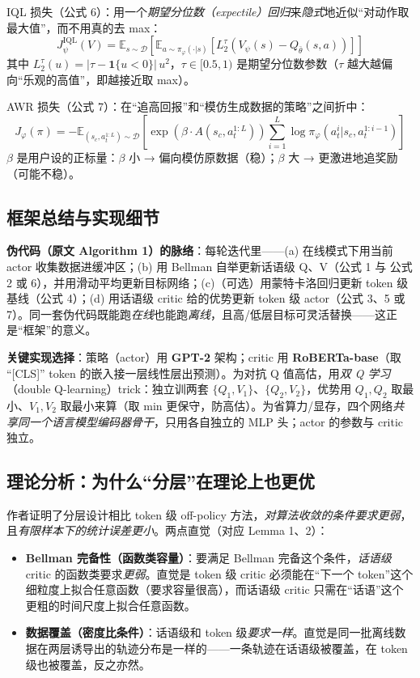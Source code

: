 \documentclass[11pt,UTF8,fontset=fandol]{ctexart}
\begin{document}
IQL 损失（公式 6）：用一个\emph{期望分位数（expectile）回归}来\emph{隐式}地近似“对动作取最大值”，而不用真的去 max：
\[ J^{\mathrm{IQL}}_\psi(V)=\mathbb{E}_{s\sim\mathcal{D}}\left[\mathbb{E}_{a\sim\pi_\varphi(\cdot|s)}\left[L^\tau_2(V_\psi(s)-Q_{\bar\theta}(s,a))\right]\right] \tag{6} \]
其中 $L^\tau_2(u)=|\tau-\mathbf{1}\{u<0\}|\,u^2$，$\tau\in[0.5,1)$ 是期望分位数参数（$\tau$ 越大越偏向“乐观的高值”，即越接近取 max）。

AWR 损失（公式 7）：在“追高回报”和“模仿生成数据的策略”之间折中：
\[ J_\varphi(\pi)=-\mathbb{E}_{(s_c,a^{1:L}_t)\sim\mathcal{D}}\left[\exp\!\left(\beta\cdot A(s_c,a^{1:L}_t)\right)\sum_{i=1}^{L}\log\pi_\varphi(a^i_t|s_c,a^{1:i-1}_t)\right] \tag{7} \]
$\beta$ 是用户设的正标量：$\beta$ 小 → 偏向模仿原数据（稳）；$\beta$ 大 → 更激进地追奖励（可能不稳）。

\subsection{框架总结与实现细节}

\textbf{伪代码（原文 Algorithm 1）的脉络}：每轮迭代里——(a) 在线模式下用当前 actor 收集数据进缓冲区；(b) 用 Bellman 自举更新话语级 Q、V（公式 1 与 公式 2 或 6），并用滑动平均更新目标网络；(c)（可选）用蒙特卡洛回归更新 token 级基线（公式 4）；(d) 用话语级 critic 给的优势更新 token 级 actor（公式 3、5 或 7）。同一套伪代码既能跑\emph{在线}也能跑\emph{离线}，且高/低层目标可灵活替换——这正是“框架”的意义。

\textbf{关键实现选择}：策略（actor）用 \textbf{GPT-2} 架构；critic 用 \textbf{RoBERTa-base}（取 “[CLS]” token 的嵌入接一层线性层出预测）。为对抗 Q 值高估，用\emph{双 Q 学习}（double Q-learning）trick：独立训两套 $\{Q_1,V_1\}$、$\{Q_2,V_2\}$，优势用 $Q_1,Q_2$ 取最小、$V_1,V_2$ 取最小来算（取 min 更保守，防高估）。为省算力/显存，四个网络\emph{共享同一个语言模型编码器骨干}，只用各自独立的 MLP 头；actor 的参数与 critic 独立。

\subsection{理论分析：为什么“分层”在理论上也更优}

作者证明了分层设计相比 token 级 off-policy 方法，\emph{对算法收敛的条件要求更弱}，且\emph{有限样本下的统计误差更小}。两点直觉（对应 Lemma 1、2）：

\begin{itemize}[leftmargin=1.5em]
\item \textbf{Bellman 完备性（函数类容量）}：要满足 Bellman 完备这个条件，\emph{话语级} critic 的函数类要求\emph{更弱}。直觉是 token 级 critic 必须能在“下一个 token”这个细粒度上拟合任意函数（要求容量很高），而话语级 critic 只需在“话语”这个更粗的时间尺度上拟合任意函数。
\item \textbf{数据覆盖（密度比条件）}：话语级和 token 级\emph{要求一样}。直觉是同一批离线数据在两层诱导出的轨迹分布是一样的——一条轨迹在话语级被覆盖，在 token 级也被覆盖，反之亦然。
\end{itemize}
\end{document}
